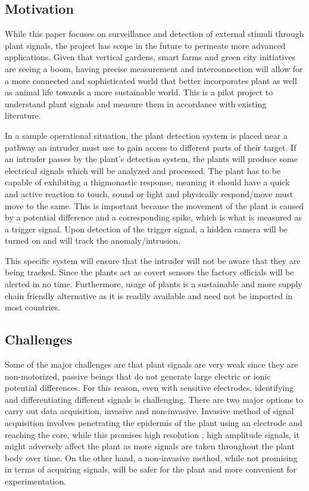 \documentclass[conference]{IEEEtran}
\begin{document}
    
    \subsection{Motivation}
    While this paper focuses on surveillance and detection of external 
    stimuli through plant signals, the project has scope in the future 
    to permeate more advanced applications. Given that vertical gardens, 
    smart farms and green city initiatives are seeing a boom, having 
    precise measurement and interconnection will allow for a more 
    connected and sophisticated world that better incorporates plant as
    well as animal life towards a more sustainable world. This is a
    pilot project to understand plant signals and measure them in 
    accordance with existing literature.

    In a sample operational situation, the plant detection system is 
    placed near a pathway an intruder must use to gain access to 
    different parts of their target. If an intruder passes by the
    plant's detection system, the plants will produce some electrical 
    signals which will be analyzed and processed. The plant has to be 
    capable of exhibiting a thigmonastic response, meaning it should 
    have a quick and active reaction to touch, sound or light and 
    physically respond/move must move to the same. This is important
    because the movement of the plant is caused by a potential difference
    and a corresponding spike, which is what is measured as a trigger 
    signal. Upon detection of the trigger signal, a hidden camera will
    be turned on and will track the anomaly/intrusion.

    This specific system will ensure that the intruder will not be aware
    that they are being tracked. Since the plants act as covert sensors 
    the factory officials will be alerted in no time. Furthermore, usage
    of plants is a sustainable and more supply chain friendly alternative
    as it is readily available and need not be imported in most countries.


    \subsection{Challenges}
    Some of the major challenges are that plant signals are very weak 
    since they are non-motorized, passive beings that do not generate 
    large electric or ionic potential differences. For this reason, even
    with sensitive electrodes, identifying and differentiating different
    signals is challenging. There are two major options to carry out data
    acquisition, invasive and non-invasive. Invasive method of signal 
    acquisition involves penetrating the epidermis of the plant using an
    electrode and reaching the core, while this promises high resolution
    , high amplitude signals, it might adversely affect the plant as 
    more signals are taken throughout the plant body over time. On the 
    other hand, a non-invasive method, while not promising in terms of
    acquiring signals, will be safer for the plant and more convenient 
    for experimentation. 
\end{document}
